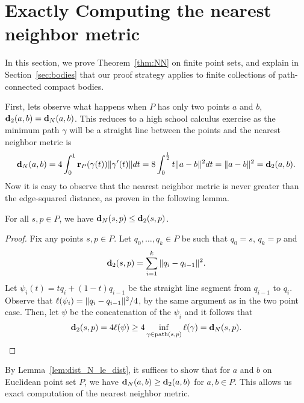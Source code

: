 \section{Exactly Computing the nearest neighbor metric}
\label{sec:NN}
In this section, we prove Theorem~\ref{thm:NN} on finite point sets, and
explain in Section~\ref{sec:bodies} that our proof strategy applies to
finite collections of path-connected compact bodies.

  First, lets observe what happens when $P$ has only two points $a$ and
$b$, $\mathbf{d}_2(a,b) = \mathbf{d}_N(a,b)$.  This reduces to a high school calculus
exercise as the minimum path $\gamma$ will be a straight line between the
points and the nearest neighbor metric is \[
    \mathbf{d}_N(a,b) = 4\int_0^1 \mathbf{r}_P(\gamma(t))\|\gamma'(t)\|dt = 8\int_0^{\frac{1}{2}} t \|a - b\|^2 dt = \|a - b\|^2 = \mathbf{d}_2(a,b).
  \]
  Now it is easy to observe that the
  nearest neighbor metric is never greater than the
  edge-squared distance, as proven in the following lemma.

  \begin{lemma}\label{lem:dist_N_le_dist}
    For all $s,p\in P$, we have $\mathbf{d}_N(s,p)\le \mathbf{d}_2(s,p)$.
  \end{lemma}
  \begin{proof}
    Fix any points $s,p\in P$.
    Let $q_0,\ldots, q_k \in P$ be such that $q_0 = s$, $q_k = p$ and
    \[
      \mathbf{d}_2(s,p) = \sum_{i=1}^k \|q_i - q_{i-1}\|^2.
    \]
    Let $\psi_i(t) = tq_i + (1-t)q_{i-1}$ be the straight line segment from $q_{i-1}$ to $q_i$.
    Observe that $\ell(\psi_i) = \|q_i - q_{i-1}\|^2 / 4$, by the same argument as in the two point case.
    Then, let $\psi$ be the concatenation of the $\psi_i$ and it follows that
    \[
      \mathbf{d}_2(s,p) = 4 \ell(\psi) \ge 4 \inf_{\gamma\in \mathrm{path}(s,p)} \ell(\gamma) = \mathbf{d}_N(s,p).\qedhere
    \]
  \end{proof}
By
Lemma~\ref{lem:dist_N_le_dist}, it suffices to show that for $a$ and $b$
on Euclidean point set $P$, we have $\mathbf{d}_N(a, b) \geq \mathbf{d}_2(a,b)$ for $a, b
\in P$. This allows us exact computation of the nearest neighbor metric.


